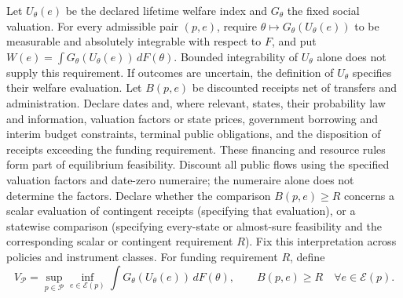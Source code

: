 \documentclass[11pt,a4paper]{article}
\begin{document}
Let \(U_\theta(e)\) be the declared lifetime welfare index and \(G_\theta\) the fixed social valuation. For every admissible pair \((p,e)\), require \(\theta\mapsto G_\theta(U_\theta(e))\) to be measurable and absolutely integrable with respect to \(F\), and put \(W(e)=\int G_\theta(U_\theta(e))\,dF(\theta)\). Bounded integrability of \(U_\theta\) alone does not supply this requirement. If outcomes are uncertain, the definition of \(U_\theta\) specifies their welfare evaluation. Let \(B(p,e)\) be discounted receipts net of transfers and administration. Declare dates and, where relevant, states, their probability law and information, valuation factors or state prices, government borrowing and interim budget constraints, terminal public obligations, and the disposition of receipts exceeding the funding requirement. These financing and resource rules form part of equilibrium feasibility. Discount all public flows using the specified valuation factors and date-zero numeraire; the numeraire alone does not determine the factors. Declare whether the comparison \(B(p,e)\geq R\) concerns a scalar evaluation of contingent receipts (specifying that evaluation), or a statewise comparison (specifying every-state or almost-sure feasibility and the corresponding scalar or contingent requirement \(R\)). Fix this interpretation across policies and instrument classes. For funding requirement \(R\), define
\[
 V_{\mathcal P}=\sup_{p\in\mathcal P}\inf_{e\in\mathcal E(p)}\int G_\theta(U_\theta(e))\,dF(\theta),
 \qquad B(p,e)\geq R\quad\forall e\in\mathcal E(p).
\]
\end{document}
